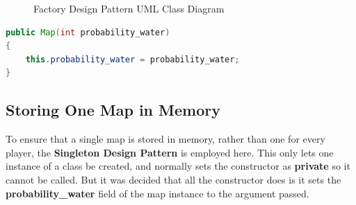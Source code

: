 \documentclass{article}
\begin{document}
\begin{figure}[ht] %
    \centering
    \caption[caption LOF]{Factory Design Pattern UML Class Diagram\protect\footnotemark}
    \label{fig:Factory}
\end{figure}

\begin{lstlisting}[language=Java, frame=single, label={lst:MapConstructor}, caption={Constructor of class Map}, captionpos=b] 
public Map(int probability_water)
{
    this.probability_water = probability_water;
}
\end{lstlisting}

\subsection{Storing One Map in Memory}

To ensure that a single map is stored in memory, rather than one for every player, the 
\textbf{Singleton Design Pattern} is employed here. This only lets one instance of a class 
be created, and normally sets the constructor as \textbf{private} so it cannot be called.
But it was decided that all the constructor does is it sets the \textbf{probability\_water}
field of the map instance to the argument passed.\\
\end{document}
